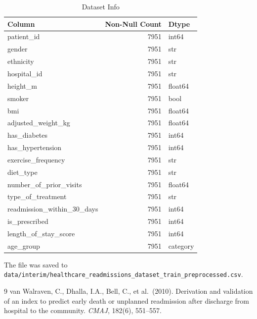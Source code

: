 \documentclass{article}
\begin{document}
\begin{table}
  \caption{Dataset Info}
  \label{tab:dataset_info}
  \begin{tabular}{lrl}
    \toprule
    Column & Non-Null Count & Dtype \\
    \midrule
    patient\_id & 7951 & int64 \\
    gender & 7951 & str \\
    ethnicity & 7951 & str \\
    hospital\_id & 7951 & str \\
    height\_m & 7951 & float64 \\
    smoker & 7951 & bool \\
    bmi & 7951 & float64 \\
    adjusted\_weight\_kg & 7951 & float64 \\
    has\_diabetes & 7951 & int64 \\
    has\_hypertension & 7951 & int64 \\
    exercise\_frequency & 7951 & str \\
    diet\_type & 7951 & str \\
    number\_of\_prior\_visits & 7951 & float64 \\
    type\_of\_treatment & 7951 & str \\
    readmission\_within\_30\_days & 7951 & int64 \\
    is\_prescribed & 7951 & int64 \\
    length\_of\_stay\_score & 7951 & int64 \\
    age\_group & 7951 & category \\
    \bottomrule
  \end{tabular}
\end{table}

\par The file was saved to \texttt{data/interim/healthcare\_readmissions\_dataset\_train\_preprocessed.csv}.

\begin{thebibliography}{9}
  van Walraven, C., Dhalla, I.A., Bell, C., et al.\ (2010).
  Derivation and validation of an index to predict early death or unplanned readmission after discharge from hospital to the community.
  \textit{CMAJ}, 182(6), 551--557.
\end{thebibliography}
\end{document}
